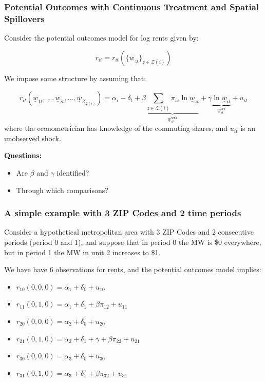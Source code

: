 \documentclass[aspectratio=169, t]{beamer}
\newcommand{\Z}{\mathcal{Z}}
\newcommand{\MW}{\underline{w}}
\begin{document}
\begin{frame}
\frametitle{Potential Outcomes with Continuous Treatment and Spatial Spillovers}
Consider the potential outcomes model for log rents given by:

\[
r_{it}=r_{it}\left(\{\underline{w}_{zt}\}_{z\in\Z(i)}\right)
\]

We impose some structure by assuming that:

\[
r_{it}(\underline{w}_{1t},...,\underline{w}_{it}, ..., \underline{w}_{Z_{\Z(i)}}) = \alpha_{i} + 
\delta_{t} + \beta \underbrace{\sum_{z\in\Z(i)}\pi_{iz}\ln \underline{w}_{zt}}_{\MW^{\text{wrk}}_{it}} +
\gamma \underbrace{\ln \underline{w}_{it}}_{\MW^{\text{res}}_{it}} + u_{it}
\]
where the econometrician has knowledge of the commuting shares, and $u_{it}$ is an unobserved shock.

\pause 

\vspace{2mm}

\textbf{Questions:} 
\begin{itemize}
    \item Are $\beta$ and $\gamma$ identified? 
    \item Through which comparisons? 
\end{itemize}
\end{frame}

\begin{frame}
\frametitle{A simple example with 3 ZIP Codes and 2 time periods}

Consider a hypothetical metropolitan area with 3 ZIP Codes and 2 consecutive 
periods (period 0 and 1), and suppose that in period 0 the MW is \$0 everywhere, but in period 1 the MW
 in unit 2 increases to \$1.

\pause 
\vspace{2mm}

We have have 6 observations for rents, and the potential outcomes model implies:
\begin{itemize}
    \item $r_{10}(0,0,0)=\alpha_{1}+\delta_{0}+u_{10}$
    \item $r_{11}(0,1,0)=\alpha_{1}+\delta_{1}+\beta\pi_{12}+u_{11}$
    \item $r_{20}(0,0,0)=\alpha_{2}+\delta_{0}+u_{20}$
    \item $r_{21}(0,1,0)=\alpha_{2}+\delta_{1}+\gamma+\beta\pi_{22}+u_{21}$
    \item $r_{30}(0,0,0)=\alpha_{3}+\delta_{0}+u_{30}$
    \item $r_{31}(0,1,0)=\alpha_{3}+\delta_{1}+\beta\pi_{32}+u_{31}$
\end{itemize}
\end{frame}
\end{document}
